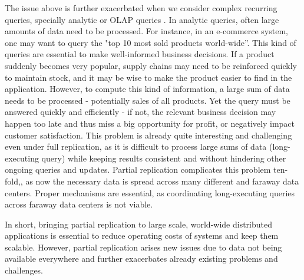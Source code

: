 The issue above is further exacerbated when we consider complex recurring queries, specially analytic or OLAP queries \cite{dbtoaster,viewSelection}.
In analytic queries, often large amounts of data need to be processed.
For instance, in an e-commerce system, one may want to query the "top 10 most sold products world-wide''.
This kind of queries are essential to make well-informed business decisions. %
If a product suddenly becomes very popular, supply chains may need to be reinforced quickly to maintain stock, and it may be wise to make the product easier to find in the application.
However, to compute this kind of information, a large sum of data needs to be processed - potentially sales of all products.
Yet the query must be answered quickly and efficiently - if not, the relevant business decision may happen too late and thus miss a big opportunity for profit, or negatively impact customer satisfaction.
This problem is already quite interesting and challenging even under full replication, as it is difficult to process large sums of data (long-executing query) while keeping results consistent and without hindering other ongoing queries and updates. %
Partial replication complicates this problem ten-fold,, as now the necessary data is spread across many different and faraway data centers.
Proper mechanisms are essential, as coordinating long-executing queries across faraway data centers is not viable.

In short, bringing partial replication to large scale, world-wide distributed applications is essential to reduce operating costs of systems and keep them scalable.
However, partial replication arises new issues due to data not being available everywhere and further exacerbates already existing problems and challenges.





